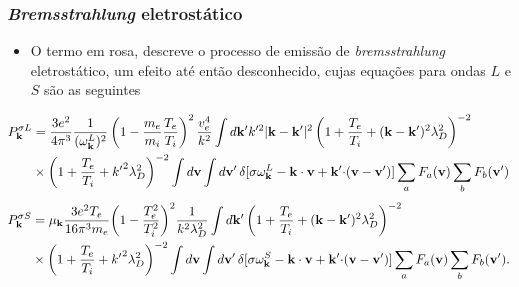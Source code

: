 \documentclass[10pt,aspectratio=1610,lualatex]{beamer}
\begin{document}
\begin{frame}
    \frametitle{\emph{Bremsstrahlung} eletrostático}
  \begin{itemize}
    \item O termo em rosa, descreve o processo de emissão de
    \emph{bremsstrahlung}  eletrostático, um efeito até então
    desconhecido, cujas equações para ondas $L$ e $S$ são
    as seguintes
  \end{itemize}
  \vspace{0.3cm}
  \begin{equation*}
    \label{PkL}
    \begin{split}
      P_{\bf k}^{\sigma L} &=
      \frac{3e^2}{4\pi^3}\frac{1}{(\omega_{\bf k}^L)^2}
      \left(1-\frac{m_e}{m_i}\frac{T_e}{T_i}\right)^2\frac{v_e^4}{k^2}
      \int d{\bf k}'k'^2|{\bf k- k'}|^2\left(1+\frac{T_e}{T_i}
	+({\bf k}-{\bf k}')^2\lambda_D^2\right)^{-2}\\
      &\times\left(1+\frac{T_e}{T_i} +{k'}^2\lambda_D^2\right)^{-2}
      \int d{\bf v}\int d{\bf v}'\,
      \delta[\sigma \omega_{\bf k}^L-{\bf k \cdot v}
      +{\bf k'\cdot}({\bf v}-{\bf v '})]
      \sum_aF_a({\bf v})\sum_bF_b({\bf v '})
    \end{split}
  \end{equation*}
    \vspace{0.1cm}
  \begin{equation*}
    \label{PkS}
    \begin{split}
      P_{\bf k}^{\sigma S} &= \mu_{\bf k}\frac{3e^2T_e}{16\pi^3m_e}
      \biggl(1-\frac{T_e^2}{T_i^2}\biggr)^2\frac{1}{k^2\lambda_D^2}
      \int d{\bf k '}\left(1+\frac{T_e}{T_i}
	+({\bf k}-{\bf k '})^2\lambda_D^2\right)^{-2}\\
      & \times\left(1+\frac{T_e}{T_i}
	+{k'}^2\lambda_D^2\right)^{-2}\int d{\bf v}\int d{\bf v '}\,
      \delta[\sigma\omega_{\bf k}^S-{\bf k \cdot v}
      +{\bf k '\cdot}({\bf v}-{\bf v '})] \sum_a F_a({\bf v})\sum_b
      F_b({\bf v '}).
    \end{split}
  \end{equation*}

\end{frame}
\end{document}
